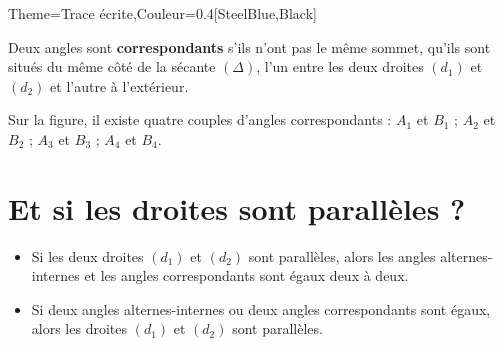 \begin{Maquette}[Cours]{Theme={Trace écrite},Couleur={0.4[SteelBlue,Black]}}
      \begin{definition*}{}
         Deux angles sont {\bf correspondants} s'ils n'ont pas le même sommet, qu'ils sont situés du même côté de la sécante $(\Delta)$, l'un entre les deux droites $(d_1)$ et $(d_2)$ et l'autre à l'extérieur.
      \end{definition*}
      
      \begin{exemple*}{}
         Sur la figure, il existe quatre couples d'angles correspondants :  $A_1$ et $B_1$ ; $A_2$ et $B_2$ ; $A_3$ et $B_3$ ; $A_4$ et $B_4$.
      \end{exemple*}
      
    
   \section{Et si les droites sont parallèles ?}
   
   \begin{propriete*}{}
      \begin{itemize}
         \item Si les deux droites $(d_1)$ et $(d_2)$ sont parallèles, alors les angles alternes-internes et les angles correspondants sont égaux deux à deux.
         \item Si deux angles alternes-internes ou deux angles correspondants sont égaux, alors les droites $(d_1)$ et $(d_2)$ sont parallèles.
      \end{itemize}
   \end{propriete*}
   

\end{Maquette}
